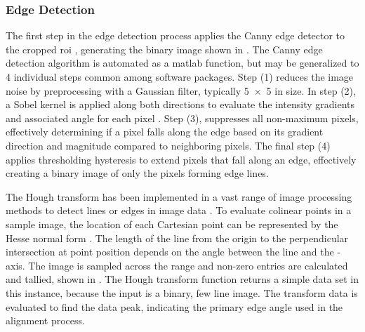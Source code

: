 \documentclass[../../../../main.tex]{subfiles}
\begin{document}
%
    \subsubsection{Edge Detection}%
    \label{app:image-processing:modulation-transfer-function:analytical-methods:edge-detection}%
    The first step in the edge detection process applies the Canny edge detector to the cropped \gls{roi} \cite{Canny_1986}, generating the binary image shown in .
    The Canny edge detection algorithm is automated as a \gls{matlab} function, but may be generalized to \num{4} individual steps common among software packages.
    Step (1) reduces the image noise by preprocessing with a Gaussian filter, typically \num{5x5} in size. 
    In step (2), a Sobel kernel is applied along both directions to evaluate the intensity gradients and associated angle for each pixel \cite{book:Shih_2010}.
    Step (3), suppresses all non-maximum pixels, effectively determining if a pixel falls along the edge based on its gradient direction and magnitude compared to neighboring pixels.  
    The final step (4) applies thresholding hysteresis to extend pixels that fall along an edge, effectively creating a binary image of only the pixels forming edge lines.
    \par%
    The Hough transform has been implemented in a vast range of image processing methods to detect lines or edges in image data \cite{Duda_1972,Hart_2009}.
    To evaluate colinear points in a sample image, the location of each Cartesian point can be represented by the Hesse normal form .
    The length  of the line from the origin to the perpendicular intersection at point position  depends on the angle  between the line and the -axis.
    The image is sampled across the range  and non-zero entries are calculated and tallied, shown in .
    The Hough transform function returns a simple data set in this instance, because the input is a binary, few line image.
    The transform data is evaluated to find the data peak, indicating the primary edge angle used in the alignment process.
\end{document}
